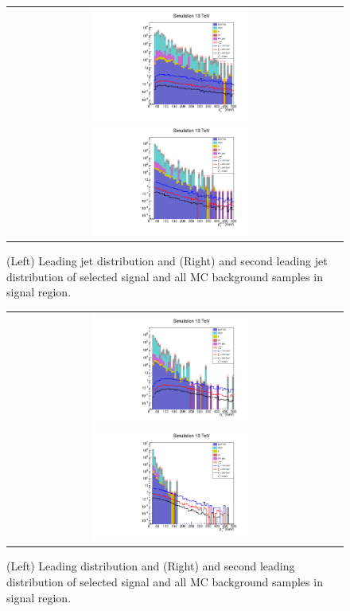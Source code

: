 \begin{figure}[tbh!]
	\centering
	\begin{tabular}{cc}
		\includegraphics[width=0.5\textwidth]{analysis/pics/h_jet1pt_Taui2TightIso.pdf}
		\includegraphics[width=0.5\textwidth]{analysis/pics/h_jet2pt_Taui2TightIso.pdf} 		
	\end{tabular}
	\caption{(Left) Leading jet \pt distribution and (Right) and second leading jet \pt distribution of selected signal and all MC background samples in signal region.}
	\label{fig::crplots3_Taui2TightIso_13tev_results}
\end{figure}

\begin{figure}[tbh!]
	\centering
	\begin{tabular}{cc}
		\includegraphics[width=0.5\textwidth]{analysis/pics/h_tau1pt_Taui2TightIso.pdf}
		\includegraphics[width=0.5\textwidth]{analysis/pics/h_tau2pt_Taui2TightIso.pdf} 		
	\end{tabular}
	\caption{(Left) Leading \hadtau \pt distribution and (Right) and second leading \hadtau \pt distribution of selected signal and all MC background samples in signal region.}
	\label{fig::crplots4_Taui2TightIso_13tev_results}
\end{figure}


